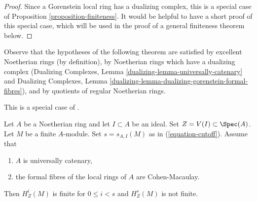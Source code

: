 \begin{proof}
Since a Gorenstein local ring has a dualizing complex,
this is a special case of Proposition \ref{proposition-finiteness}.
It would be helpful to have a short proof of this special case,
which will be used in the proof of a general finiteness theorem below.
\end{proof}

\noindent
Observe that the hypotheses of the following theorem are satisfied
by excellent Noetherian rings (by definition),
by Noetherian rings which have a dualizing complex
(Dualizing Complexes, Lemma \ref{dualizing-lemma-universally-catenary} and
Dualizing Complexes, Lemma
\ref{dualizing-lemma-dualizing-gorenstein-formal-fibres}), and
by quotients of regular Noetherian rings.

\begin{theorem}
\label{theorem-finiteness}
\begin{reference}
This is a special case of \cite[Satz 2]{Faltings-finiteness}.
\end{reference}
Let $A$ be a Noetherian ring and let $I \subset A$ be an ideal.
Set $Z = V(I) \subset \Spec(A)$. Let $M$ be a finite $A$-module.
Set $s = s_{A, I}(M)$ as in (\ref{equation-cutoff}).
Assume that
\begin{enumerate}
\item $A$ is universally catenary,
\item the formal fibres of the local rings of $A$ are Cohen-Macaulay.
\end{enumerate}
Then $H^i_Z(M)$ is finite for $0 \leq i < s$ and
$H^s_Z(M)$ is not finite.
\end{theorem}

